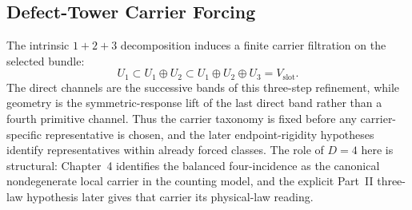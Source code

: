 \subsection{Defect-Tower Carrier Forcing}
\label{subsec:defect-tower-forcing}

The intrinsic \(1+2+3\) decomposition induces a finite carrier filtration on
the selected bundle:
\[
U_1
\subset
U_1\oplus U_2
\subset
U_1\oplus U_2\oplus U_3 = V_{\mathrm{slot}}.
\]
The direct channels are the successive bands of this three-step refinement,
while geometry is the symmetric-response lift of the last direct band rather
than a fourth primitive channel. Thus the carrier taxonomy is fixed before any
carrier-specific representative is chosen, and the later endpoint-rigidity
hypotheses identify representatives within already forced classes.
The role of \(D=4\) here is structural: Chapter~4 identifies the balanced
four-incidence as the canonical nondegenerate local carrier in the counting
model, and the explicit Part~II three-law hypothesis later gives that carrier
its physical-law reading.

